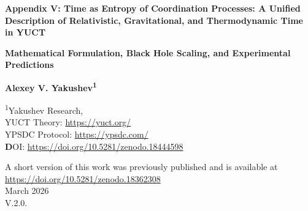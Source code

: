 \documentclass[12pt,a4paper]{article}
\newcommand{\Keff}{K_{\mathrm{eff}}}
\begin{document}
	
	\begin{titlepage}
		\begin{center}
			\vspace*{1cm}
			
			\Huge\textbf{Appendix V: Time as Entropy of Coordination Processes: A Unified Description of Relativistic, Gravitational, and Thermodynamic Time in YUCT}
			
			\vspace{1cm}
			\Large\textbf{Mathematical Formulation, Black Hole Scaling, and Experimental Predictions}
			
			\vspace{1.5cm}
			
			\Large\textbf{Alexey V. Yakushev\textsuperscript{1}}
			
			\vspace{0.3cm}
			\large
			\textsuperscript{1}Yakushev Research, \\	YUCT Theory: \url{https://yuct.org/}\\
			YPSDC Protocol: \url{https://ypsdc.com/}\\
			
			
			\vspace{2cm}
			\textbf DOI: \url{https://doi.org/10.5281/zenodo.18444598}\\
			
			\vspace{1cm}
			
			\vspace{0cm}
			\large 
			A short version of this work was previously published and is available at\\ \url{https://doi.org/10.5281/zenodo.18362308}\\
			\vspace{1cm}
			March 2026 \\ \large V.2.0.
			
			\vspace{2cm}
			
			\begin{minipage}{0.9\textwidth}
				\begin{abstract}
					\noindent
					This appendix presents a new interpretation of time within the Yakushev Unified Coordination Theory (YUCT). Time is identified with the entropy of coordination processes, quantified by the coordination efficiency \(\Keff\). We show that the Lorentz factor \(\gamma\) in special relativity and the gravitational time dilation in general relativity emerge naturally as specific forms of \(\Keff\). A unified expression for proper time \(d\tau = dt/\Keff(v,\Phi)\) is derived, which reduces to the standard formulas in the appropriate limits. For a photon (\(v=c\)), \(\Keff \to \infty\) and proper time vanishes, explaining why light does not experience time. Quantization of coordination entropy leads to a fundamental discreteness of time on the Planck scale, linking to quantum gravity. 
					

\end{abstract}
\end{minipage}
\end{center}
\end{titlepage}
\end{document}
